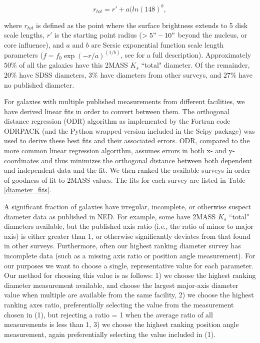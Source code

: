 \documentclass[twocolumn,tighten]{aastex62}
\begin{document}
\begin{equation}
r_{tot} = r' + a(ln(148)^b,
\end{equation}

\noindent where $r_{tot}$ is defined as the point where the surface brightness extends to 5 disk scale lengths, $r'$ is the starting point radius ($>5" - 10"$ beyond the nucleus, or core influence), and $a$ and $b$ are Sersic exponential function scale length parameters ($f = f_0 \exp{(-r/a)}^{(1/b)}$, see \citealt{jarrett2003} for a full description). Approximately $50\%$ of all the galaxies have this 2MASS $K_s$ ``total" diameter. Of the remainder, $20\%$ have SDSS diameters, $3\%$ have diameters from other surveys, and $27\%$ have no published diameter. 

For galaxies with multiple published measurements from different facilities, we have derived linear fits in order to convert between them. The orthogonal distance regression (ODR) algorithm as implemented by the Fortran code ODRPACK (and the Python wrapped version included in the Scipy package) was used to derive these best fits and their associated errors. ODR, compared to the more common linear regression algorithm, assumes errors in both x- and y-coordinates and thus minimizes the orthogonal distance between both dependent and independent data and the fit. We then ranked the available surveys in order of goodness of fit to 2MASS values. The fits for each survey are listed in Table \ref{diameter_fits}. 

A significant fraction of galaxies have irregular, incomplete, or otherwise suspect diameter data as published in NED. For example, some have 2MASS $K_s$ ``total" diameters available, but the published axis ratio (i.e., the ratio of minor to major axis) is either greater than 1, or otherwise significantly deviates from that found in other surveys. Furthermore, often our highest ranking diameter survey has incomplete data (such as a missing axis ratio or position angle measurement). For our purposes we want to choose a single, representative value for each parameter. Our method for choosing this value is as follows: 1) we choose the highest ranking diameter measurement available, and choose the largest major-axis diameter value when multiple are available from the same facility, 2) we choose the highest ranking axes ratio, preferentially selecting the value from the measurement chosen in (1), but rejecting a ratio = 1 when the average ratio of all measurements is less than 1, 3) we choose the highest ranking position angle measurement, again preferentially selecting the value included in (1).
\end{document}
